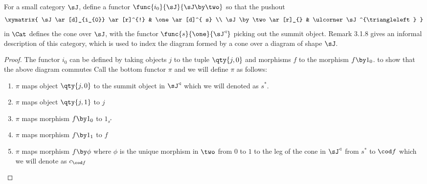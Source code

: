 \documentclass[../../main]{subfiles}
\begin{document}
\begin{exercise}
	For a small category $\sJ$, define a functor $\func{i_{0}}{\sJ}{\sJ \by \two}$ so that the pushout
	$$\xymatrix{ \sJ  \ar[d]_{i_{0}} \ar[r]^{!} & \one \ar[d]^{ s}  \\    \sJ \by \two \ar[r]_{}  & \ulcorner \sJ^{\triangleleft}  } $$ in $\Cat$ defines the cone over $\sJ$, with the functor $\func{s}{\one}{\sJ^{\triangleleft} }$ picking out the summit object. Remark 3.1.8 gives an informal description of this category, which is used to index the diagram formed by a cone over a diagram of shape $\sJ$.
\end{exercise}

\begin{proof}
	The functor  $i_{0}$ can be defined by taking objects $j$ to the tuple $\qty{j,0}$ and morphisms $f$ to the morphism $f \by 1_{0}$. to show that the above diagram commutes Call the bottom functor $\pi$ and we will define $\pi$ as follows:
	\begin{enumerate}
		\item $\pi$ maps object $\qty{j,0}$ to the summit object in $\sJ^{\triangleleft} $ which we will denoted as $s^{*}$.
		\item $\pi$ maps object $\qty{j,1}$ to $j$
		\item $\pi$ maps morphism $f\by1_{0}$ to $1_{s^{*}}$
		\item $\pi$ maps morphism $f \by 1_{1}$ to $f$
		\item $\pi$ maps morphism $f \by \phi$ where $\phi$ is the unique morphism in $\two$ from $0$ to $1$ to the leg of the cone in $\sJ^{\triangleleft} $ from $s^{*}$ to $\cod f$ which we will denote as $c_{\cod f}$
	\end{enumerate}


\end{proof}
\end{document}
